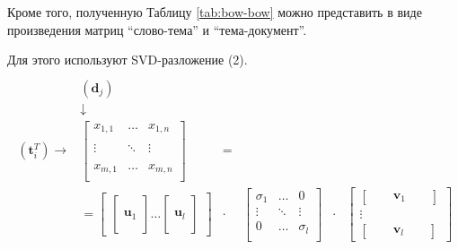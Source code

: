 Кроме того, полученную Таблицу \ref{tab:bow-bow} можно представить в виде произведения матриц “слово-тема” и “тема-документ”.

Для этого используют SVD-разложение (2).
\begin{eqnarray}\label{eq:svd}
{\displaystyle 
{\begin{matrix}
\\&({\textbf {d}}_{j})&&&&&&&\\&\downarrow &&&&&&& \\({\textbf {t}}_{i}^{T})\rightarrow &{
\begin{bmatrix}x_{1,1}&\dots &x_{1,n}\\\\\vdots &\ddots &\vdots \\\\x_{m,1}&\dots &x_{m,n}\\\end{bmatrix}}&=
\\&= {\begin{bmatrix}
{\begin{bmatrix}\,\\\,\\{\textbf {u}}_{1}\\\,\\\,\end{bmatrix}}\dots  
{\begin{bmatrix}\,\\\,\\{\textbf {u}}_{l}\\\,\\\,\end{bmatrix}}
\end{bmatrix}}&\cdot &
   {\begin{bmatrix}\sigma _{1}&\dots &0\\\vdots &\ddots &\vdots \\0&\dots &\sigma _{l}\\\end{bmatrix}}&\cdot &
   {\begin{bmatrix}
   {\begin{bmatrix}&&{\textbf {v}}_{1}&&\end{bmatrix}}\\\vdots \\
   {\begin{bmatrix}&&{\textbf {v}}_{l}&& \end{bmatrix}}
   \end{bmatrix}}
 \end{matrix}}}
\end{eqnarray}


